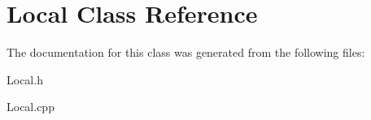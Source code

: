 \hypertarget{class_local}{}\section{Local Class Reference}
\label{class_local}


The documentation for this class was generated from the following files\+:\begin{DoxyCompactItemize}
\item 
Local.\+h\item 
Local.\+cpp\end{DoxyCompactItemize}
